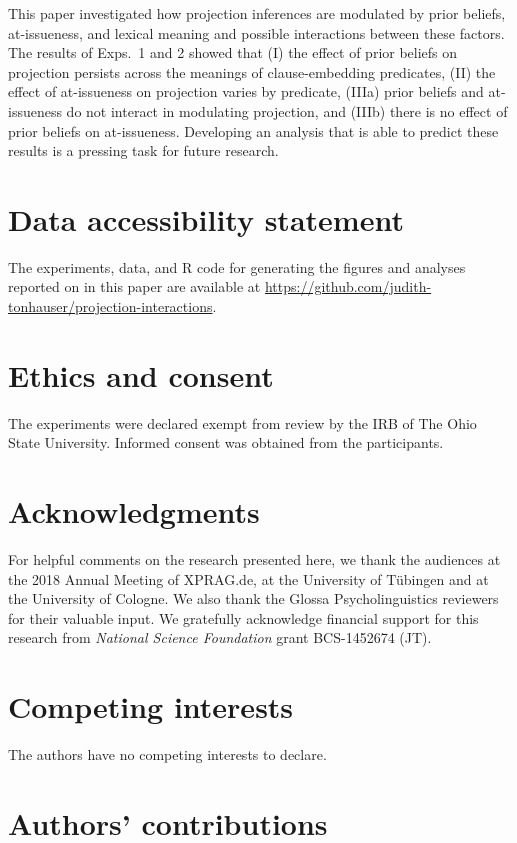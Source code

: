 \documentclass[11pt,fleqn]{article}
\newcommand{\6}{\mbox{$[\hspace*{-.6mm}[$}}
\newcommand{\9}{\mbox{$]\hspace*{-.6mm}]$}}
\begin{document}
This paper investigated how projection inferences are modulated by prior beliefs, at-issueness, and lexical meaning and possible interactions between these factors. The results of Exps.~1 and 2 showed that (I) the effect of prior beliefs on projection persists across the meanings of clause-embedding predicates, (II) the effect of at-issueness on projection varies by predicate, (IIIa) prior beliefs and at-issueness do not interact in modulating projection, and (IIIb) there is no effect of prior beliefs on at-issueness. Developing an analysis that is able to predict these results is a pressing task for future research.


\section*{Data accessibility statement}

The experiments, data, and R code for generating the figures and analyses reported on in this paper are available at \url{https://github.com/judith-tonhauser/projection-interactions}.

\section*{Ethics and consent}

The experiments were declared exempt from review by the IRB of The Ohio State University. Informed consent was obtained from the participants.

\section*{Acknowledgments}

For helpful comments on the research presented here, we thank the audiences at the 2018 Annual Meeting of XPRAG.de, at the University of T\"ubingen and at the University of Cologne. We also thank the Glossa Psycholinguistics reviewers for their valuable input. We gratefully acknowledge financial support for this research from {\em National Science Foundation} grant BCS-1452674 (JT).

\section*{Competing interests}

The authors have no competing interests to declare.

\section*{Authors' contributions}
\end{document}
